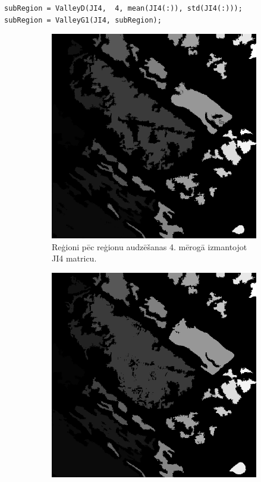 \documentclass[12pt,paper=a4]{report}
\begin{document}
\begin{lstlisting}
subRegion = ValleyD(JI4,  4, mean(JI4(:)), std(JI4(:)));
subRegion = ValleyG1(JI4, subRegion);
\end{lstlisting}\par
\begin{figure}[h!]
\centering
\begin{subfigure}[b]{.3\linewidth}
\includegraphics[width=\linewidth]{regionPecValleyG1S4JI4}
\caption{Reģioni pēc reģionu audzēšanas 4. mērogā izmantojot JI4 matricu.}
\label{subfig:valleyg1s4ji4}
\end{subfigure}
\begin{subfigure}[b]{.3\linewidth}
\includegraphics[width=\linewidth]{regionPecValleyG1S4JI3}

\end{subfigure}
\end{figure}
\end{document}
